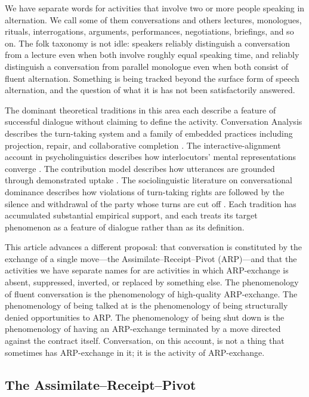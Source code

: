 We have separate words for activities that involve two or more people speaking in alternation. We call some of them conversations and others lectures, monologues, rituals, interrogations, arguments, performances, negotiations, briefings, and so on. The folk taxonomy is not idle: speakers reliably distinguish a conversation from a lecture even when both involve roughly equal speaking time, and reliably distinguish a conversation from parallel monologue even when both consist of fluent alternation. Something is being tracked beyond the surface form of speech alternation, and the question of what it is has not been satisfactorily answered.

The dominant theoretical traditions in this area each describe a feature of successful dialogue without claiming to define the activity. Conversation Analysis describes the turn-taking system \citep{Sacks1974} and a family of embedded practices including projection, repair, and collaborative completion \citep{Lerner1991,Hayashi2003}. The interactive-alignment account in psycholinguistics describes how interlocutors' mental representations converge \citep{PickeringGarrod2004,PickeringGarrod2013}. The contribution model describes how utterances are grounded through demonstrated uptake \citep{ClarkSchaefer1989,ClarkBrennan1991}. The sociolinguistic literature on conversational dominance describes how violations of turn-taking rights are followed by the silence and withdrawal of the party whose turns are cut off \citep{ZimmermanWest1975,WestZimmerman1983,Itakura2001}. Each tradition has accumulated substantial empirical support, and each treats its target phenomenon as a feature of dialogue rather than as its definition.

This article advances a different proposal: that conversation is constituted by the exchange of a single move---the Assimilate--Receipt--Pivot (ARP)---and that the activities we have separate names for are activities in which ARP-exchange is absent, suppressed, inverted, or replaced by something else. The phenomenology of fluent conversation is the phenomenology of high-quality ARP-exchange. The phenomenology of being talked at is the phenomenology of being structurally denied opportunities to ARP. The phenomenology of being shut down is the phenomenology of having an ARP-exchange terminated by a move directed against the contract itself. Conversation, on this account, is not a thing that sometimes has ARP-exchange in it; it is the activity of ARP-exchange.

\subsection{The Assimilate--Receipt--Pivot}

